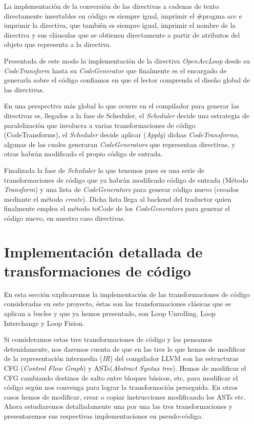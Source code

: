 La implementación de la conversión de las directivas a cadenas de texto directamente insertables en código es siempre igual, imprimir el \#pragma acc e imprimir la directiva, que también es siempre igual, imprimir el nombre de la directiva y sus cláusulas que se obtienen directamente a partir de atributos del objeto que representa a la directiva.

Presentada de este modo la implementación de la directiva \textit{OpenAccLoop} desde su \textit{CodeTransform} hasta su \textit{CodeGenerator} que finalmente es el encargado de generarla sobre el código confiamos en que el lector comprenda el diseño global de las directivas.

En una perspectiva más global lo que ocurre en el compilador para generar las directivas es, llegados a la fase de Scheduler, el \textit{Scheduler} decide una estrategia de paralelización que involucra a varias transformaciones de código (CodeTransforms), el \textit{Scheduler} decide aplicar (\textit{Apply}) dichas \textit{CodeTransforms}, algunas de las cuales generaran \textit{CodeGenerators} que representan directivas, y otras habrán modificado el propio código de entrada.

Finalizada la fase de \textit{Scheduler} lo que tenemos pues es una serie de transformaciones de código que ya habrán modificado código de entrada (Método \textit{Transform}) y una lista de \textit{CodeGenerators} para generar código nuevo (creados mediante el método \textit{create}). Dicha lista llega al backend del traductor quien finalmente emplea el método toCode de los \textit{CodeGenerators} para generar el código nuevo, en nuestro caso directivas.

\section{Implementación detallada de transformaciones de código}

En esta sección explicaremos la implementación de las transformaciones de código consideradas en este proyecto, éstas son las transformaciones clásicas que se aplican a bucles y que ya hemos presentado, son Loop Unrolling, Loop Interchange y Loop Fision.

Si consideramos estas tres transformaciones de código y las pensamos detenidamente, nos daremos cuenta de que en las tres lo que hemos de modificar de la representación intermedia (\textit{IR}) del compilador LLVM son las estructuras CFG (\textit{Control Flow Graph}) y ASTs(\textit{Abstract Syntax tree}).
Hemos de modificar el CFG cambiando destinos de salto entre bloques básicos, etc, para modificar el código según nos convenga para lograr la transformación perseguida. En otros casos hemos de modificar, crear o copiar instrucciones modificando los ASTs etc.
Ahora estudiaremos detalladamente una por una las tres transformaciones y presentaremos sus respectivas implementaciones en pseudo-código.

